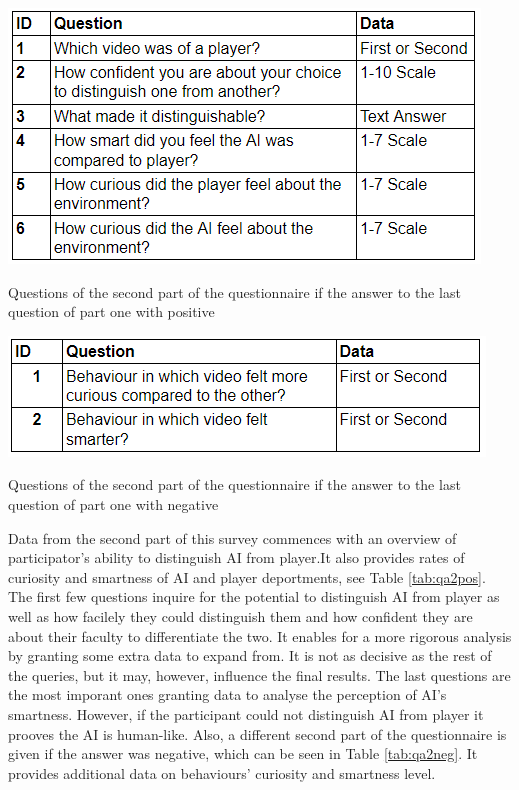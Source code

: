 \documentclass[journal]{IEEEtran}
\begin{document}
\begin{table}
	\includegraphics[width=\linewidth]{Images/QA2Positive.PNG}
	\caption{Questions of the second part of the questionnaire if the answer to the last question of part one with positive}
	\label{tab:qa2pos}
\end{table}

\begin{table}
	\includegraphics[width=\linewidth]{Images/QA2Negative.PNG}
	\caption{Questions of the second part of the questionnaire if the answer to the last question of part one with negative}
	\label{tab:qa2neg}
\end{table}

Data from the second part of this survey commences with an overview of participator's ability to distinguish AI from player.It also provides rates of curiosity and smartness of AI and player deportments, see Table \ref{tab:qa2pos}. The first few questions inquire for the potential to distinguish AI from player as well as how facilely they could distinguish them and how confident they are about their faculty to differentiate the two. It enables for a more rigorous analysis by granting some extra data to expand from. It is not as decisive as the rest of the queries, but it may, however, influence the final results. The last questions are the most imporant ones granting data to analyse the perception of AI's smartness. However, if the participant could not distinguish AI from player it prooves the AI is human-like. Also, a different second part of the questionnaire is given if the answer was negative, which can be seen in Table \ref{tab:qa2neg}. It provides additional data on behaviours' curiosity and smartness level.
\end{document}
